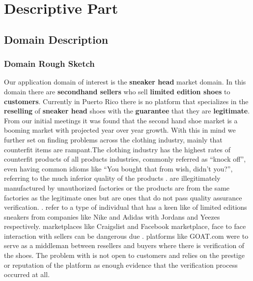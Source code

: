 \chapter{Descriptive Part}
\newpage
\section{Domain Description}
\subsection{Domain Rough Sketch}
Our application domain of interest is the \textbf{sneaker head} market domain. In this domain there are \textbf{secondhand sellers} who sell \textbf{limited edition shoes} to \textbf{customers}. Currently in Puerto Rico there is no platform that specializes in the \textbf{reselling} of \textbf{sneaker head} shoes with the \textbf{guarantee} that they are \textbf{legitimate}. From our initial meetings it was found that the second hand shoe market is a booming market with projected year over year growth. With this in mind we further set on finding problems across the clothing industry, mainly that counterfit items are rampant.{The} clothing industry has the highest rates of counterfit products of all products industries, commonly referred as ``knock off'', even having common idioms like ``You bought that from wish, didn't you?'', referring to the much inferior quality of the products \cite{InfographicIndustriesMost2019}. are illegitimately manufactured by unauthorized factories or the products are from the same factories as the legitimate ones but are ones that do not pass quality assurance verification. .  refer to a type of individual that has a keen like of limited editions sneakers from companies like Nike and Adidas with Jordans and Yeezes respectively.  marketplaces like Craigslist and Facebook marketplace, face to face interaction with sellers can be dangerous due . platforms like GOAT.com were  to serve as a middleman between resellers and buyers where there is  verification of the shoes.  The problem with   is not open to customers and relies on the prestige or reputation of the platform as enough evidence that the verification process occurred at all.
